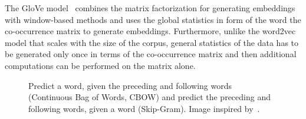 The GloVe model~  combines the matrix factorization for generating embeddings with window-based methods and uses the global statistics in form of the word the co-occurrence matrix to generate embeddings. Furthermore, unlike the word2vec model that scales with the size of the corpus, general statistics of the data has to be generated only once in terms of the co-occurrence matrix and then additional computations can be performed on the matrix alone.
\begin{figure}
\centering 
\resizebox{0.63\textwidth}{0.5\textwidth}{      

}
\caption{Predict a word, given the preceding and following words (Continuous Bag of Words, CBOW) and predict the preceding and following words, given a word (Skip-Gram). Image inspired by~.}
\label{fig:w2v}
\end{figure}
